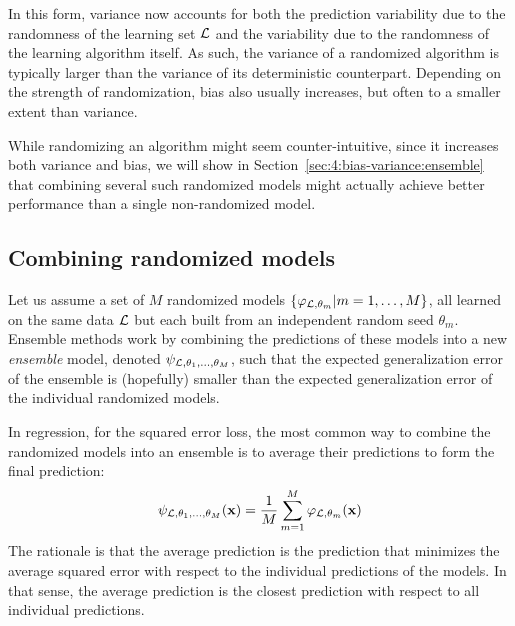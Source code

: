 In this form, variance now accounts for both the prediction variability due to
the randomness of the learning set ${\cal L}$ and the variability due to the
randomness of the learning algorithm itself. As such, the variance of a
randomized algorithm is typically larger than the variance of its
deterministic counterpart. Depending on the strength of randomization, bias
also usually increases, but often to a smaller extent than variance.

While randomizing an algorithm might seem counter-intuitive, since it
increases both variance and bias, we will show in Section~\ref{sec:4:bias-variance:ensemble}
that combining several such randomized models might actually
achieve better performance than a single non-randomized model.


\subsection{Combining randomized models}

Let us assume a set of $M$\label{ntn:M} randomized models $\{\varphi_{{\cal L}, \theta_m} |
m = 1, \dots, M \}$, all learned on the same data ${\cal L}$ but each built
from an independent random seed $\theta_m$\label{ntn:theta-seed}\label{ntn:theta-seed-m}. Ensemble methods work by combining
the predictions of these models into a new \textit{ensemble} model, denoted
$\psi_{{\cal L},\theta_1,\dots,\theta_M}$\label{ntn:psi}, such that the expected
generalization error of the ensemble is (hopefully) smaller than the expected
generalization error of the individual randomized models.

In regression, for the squared error loss, the most common way to combine the
randomized models into an ensemble is to average their predictions to form the
final prediction:
\begin{equation}\label{eqn:4:averaging}
\psi_{{\cal L},\theta_1,\dots,\theta_M}(\mathbf{x}) = \frac{1}{M} \sum_{m=1}^M \varphi_{{\cal L},\theta_m}(\mathbf{x})
\end{equation}
The rationale is that the average prediction is the prediction that minimizes the average
squared error with respect to the individual predictions of the models. In that sense, the average prediction is the closest prediction with respect to all individual predictions.

